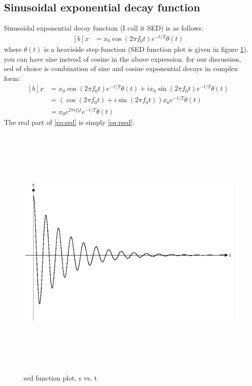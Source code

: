 \documentclass[letterpaper, 11pt]{article}
\newcommand{\sed}[2]{#2_{0}e^{2\pi if_{0}#1}e^{-#1/T} \theta (#1)} %
\numberwithin{equation}{section}
\numberwithin{figure}{section}
\numberwithin{table}{section}
\begin{document}
\subsection{Sinusoidal exponential decay function}
Sinusoidal exponential decay function (I call it SED) is as follows:
\begin{equation}
	\begin{aligned}[b]
		x &= x_{0}\cos{(2\pi f_{0}t)}e^{-t/T} \theta(t)
		\label{eq:rsed}
	\end{aligned}
\end{equation}
where \(\theta (t)\) is a heaviside step function (SED function plot is given in figure \ref{fig1}). you can have sine instead of cosine in the above expression. for our discussion, sed of choice is combination of sine and cosine exponential decays in complex form:
\begin{equation}
	\begin{aligned}[b]
		x	&= x_{0}\cos{(2\pi f_{0}t)}e^{-t/T} \theta(t)+ i x_{0}\sin{(2\pi f_{0}t)}e^{-t/T} \theta(t)\\
			&= (\cos{(2\pi f_{0}t)} +i \sin{(2\pi f_{0}t)})x_{0}e^{-t/T} \theta(t) \\
			&= \sed{t}{x}
			\label{eq:sed}
	\end{aligned}
\end{equation}
The real part of \eqref{eq:sed} is simply \eqref{eq:rsed}.


\begin{figure}[H]
	\centering
	\includegraphics[height=5in]{sed.eps}
	\caption{sed function plot, s vs. t}
	\label{fig1}
\end{figure}
\end{document}
